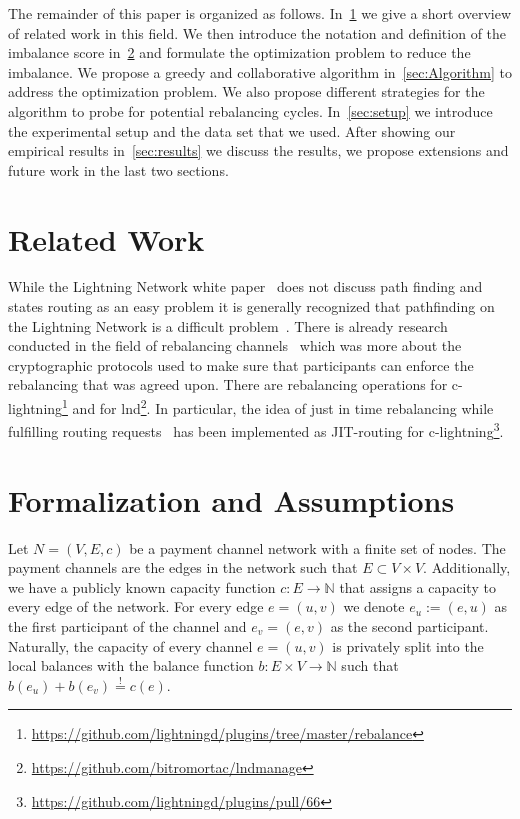 \documentclass[conference]{IEEEtran}
\begin{document}
The remainder of this paper is organized as follows. In~\cref{sec:relatedWork} we give a short overview of related work in this field.
We then introduce the notation and definition of the imbalance score in~\cref{sec:formalization} and formulate the optimization problem to reduce the imbalance.
We propose a greedy and collaborative algorithm in~\cref{sec:Algorithm} to address the optimization problem.
We also propose different strategies for the algorithm to probe for potential rebalancing cycles.
In~\cref{sec:setup} we introduce the experimental setup and the data set that we used.
After showing our empirical results in~\cref{sec:results} we discuss the results, 
we propose extensions and future work in the last two sections.



\section{Related Work}
\label{sec:relatedWork}

While the Lightning Network white paper~\cite{poon2016bitcoin} does not discuss path finding and states routing as an easy problem it is generally recognized that pathfinding on the Lightning Network is a difficult problem~\cite{piatkivskyi2018split, prihodko2016flare, bagaria2019boomerang, pickhardt2019pathfinding, grunspan2018ant, sivaraman2018routing}.
There is already research conducted in the field of rebalancing channels~\cite{khalil2017revive} which was more about the cryptographic protocols used to make sure that participants can enforce the rebalancing that was agreed upon.
There are rebalancing operations for c-lightning\footnote{\url{https://github.com/lightningd/plugins/tree/master/rebalance}} and for lnd\footnote{\url{https://github.com/bitromortac/lndmanage}}.
In particular, the idea of just in time rebalancing while fulfilling routing requests~\cite{pickhardt2019jit} has been implemented as JIT-routing for c-lightning\footnote{\url{https://github.com/lightningd/plugins/pull/66}}. 



\section{Formalization and Assumptions}
\label{sec:formalization}

Let $N=(V,E,c)$ be a payment channel network with a finite set of nodes.
The payment channels are the edges in the network such that $E\subset V\times V$.
Additionally, we have a publicly known capacity function $c: E\longrightarrow \mathbb{N}$ that assigns a capacity to every edge of the network.
For every edge $e=(u,v)$ we denote $e_u:=(e,u)$ as the first participant of the channel and $e_v=(e,v)$ as the second participant.
Naturally, the capacity of every channel $e=(u,v)$ is privately split into the local balances with the balance function $b: E\times V\longrightarrow\mathbb{N}$ such that $b(e_u)+b(e_v)\stackrel{!}{=}c(e)$.
\end{document}
